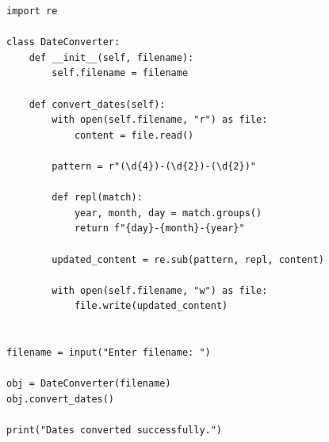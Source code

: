 \begin{verbatim}
import re

class DateConverter:
    def __init__(self, filename):
        self.filename = filename

    def convert_dates(self):
        with open(self.filename, "r") as file:
            content = file.read()

        pattern = r"(\d{4})-(\d{2})-(\d{2})"

        def repl(match):
            year, month, day = match.groups()
            return f"{day}-{month}-{year}"

        updated_content = re.sub(pattern, repl, content)

        with open(self.filename, "w") as file:
            file.write(updated_content)


filename = input("Enter filename: ")

obj = DateConverter(filename)
obj.convert_dates()

print("Dates converted successfully.")
\end{verbatim}